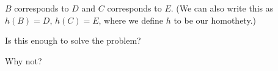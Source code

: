 





$B$ corresponds to $D$ and $C$ corresponds to $E$. (We can also write this as $h(B) = D$, $h(C) = E$, where we define $h$ to be our homothety.)

Is this enough to solve the problem?







Why not?







